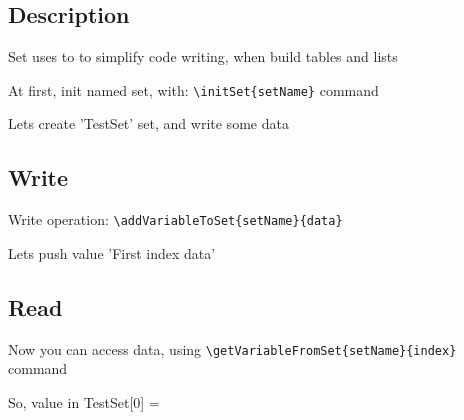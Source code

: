 \documentclass{lib/styles/default-style}
\begin{document}
\pagestyle{no-numbered}

\subsection*{\textbf{Description}}
Set uses to to simplify code writing, when build tables and lists

At first, init named set, with: \verb+\initSet{setName}+ command

Lets create 'TestSet' set, and write some data

\subsection*{\textbf{Write}}
Write operation: \verb+\addVariableToSet{setName}{data}+

Lets push value 'First index data'

\subsection*{\textbf{Read}}
Now you can access data, using \verb+\getVariableFromSet{setName}{index}+ command

So, value in TestSet[0] = 
\end{document}

